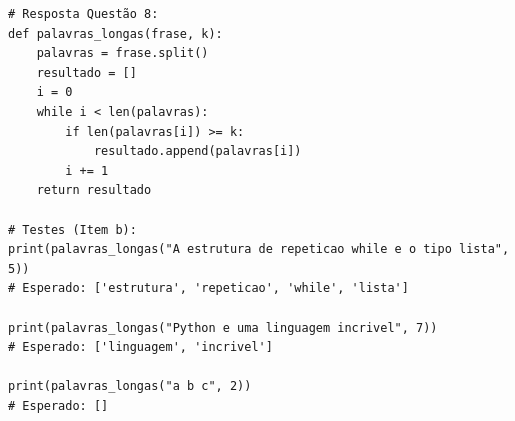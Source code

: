 \ifmostrarGabarito
\begin{verbatim}
# Resposta Questão 8:
def palavras_longas(frase, k):
    palavras = frase.split()
    resultado = []
    i = 0
    while i < len(palavras):
        if len(palavras[i]) >= k:
            resultado.append(palavras[i])
        i += 1
    return resultado

# Testes (Item b):
print(palavras_longas("A estrutura de repeticao while e o tipo lista", 5))
# Esperado: ['estrutura', 'repeticao', 'while', 'lista']

print(palavras_longas("Python e uma linguagem incrivel", 7))
# Esperado: ['linguagem', 'incrivel']

print(palavras_longas("a b c", 2))
# Esperado: []
\end{verbatim}
\fi
